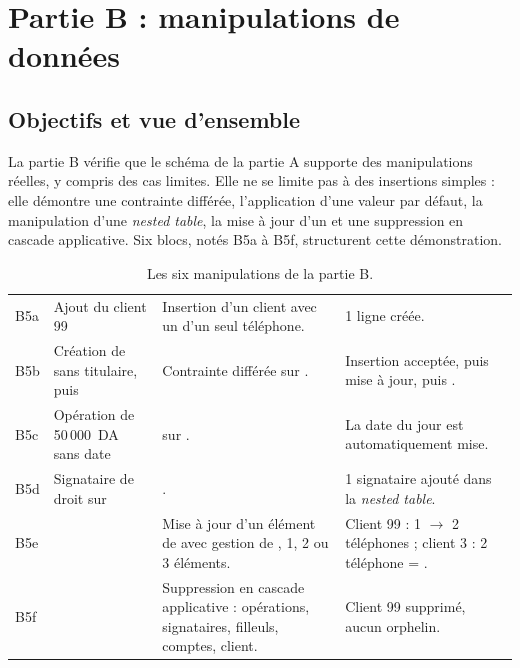 \chapter{Partie B : manipulations de données}
\label{chap:partieB}

\section{Objectifs et vue d'ensemble}

La partie B vérifie que le schéma de la partie A supporte des manipulations
réelles, y compris des cas limites. Elle ne se limite pas à des insertions
simples : elle démontre une contrainte différée, l'application d'une valeur par
défaut, la manipulation d'une \emph{nested table}, la mise à jour d'un
 et une suppression en cascade applicative. Six blocs, notés B5a
à B5f, structurent cette démonstration.

\begin{table}[htbp]
  \centering
  \small
  \caption{Les six manipulations de la partie B.}
  \label{tab:manipulations-B}
  \begin{tabularx}{\textwidth}{@{}C{1.0cm}L{4.7cm}L{4.5cm}X@{}}
    \toprule
     &  &  &
     \\
    \midrule
    B5a & Ajout du client 99  &
    Insertion d'un client avec un  d'un seul téléphone. &
    1 ligne créée. \\
    B5b & Création de  sans titulaire, puis  &
    Contrainte  différée sur . &
    Insertion acceptée, puis mise à jour, puis . \\
    B5c & Opération de 50\,000~DA sans date &
     sur . &
    La date du jour est automatiquement mise. \\
    B5d & Signataire de droit  sur  &
    . &
    1 signataire ajouté dans la \emph{nested table}. \\
    B5e &  &
    Mise à jour d'un élément de  avec gestion de ,
    1, 2 ou 3 éléments. &
    Client 99 : 1 $\rightarrow$ 2 téléphones ; client 3 : 2 téléphone
    = . \\
    B5f &  &
    Suppression en cascade applicative : opérations, signataires, filleuls,
    comptes, client. &
    Client 99 supprimé, aucun orphelin. \\
    \bottomrule
  \end{tabularx}
\end{table}

